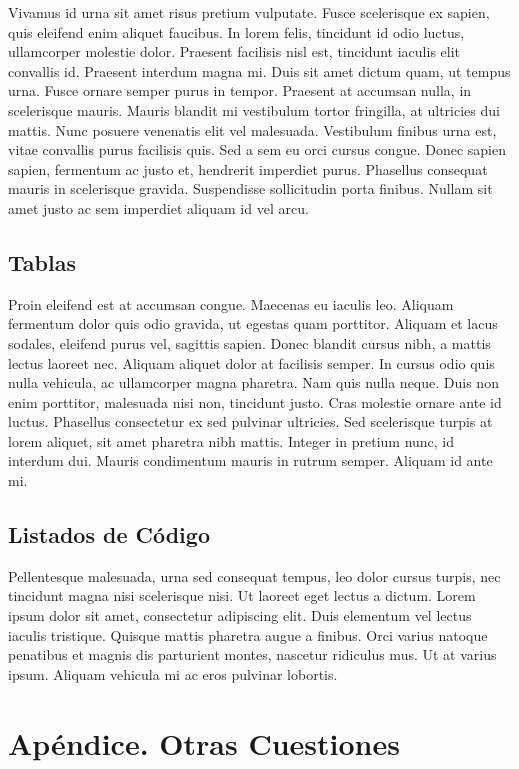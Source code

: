 \documentclass{article}
\begin{document}
Vivamus id urna sit amet risus pretium vulputate. Fusce scelerisque ex sapien, quis eleifend enim aliquet faucibus. In lorem felis, tincidunt id odio luctus, ullamcorper molestie dolor. Praesent facilisis nisl est, tincidunt iaculis elit convallis id. Praesent interdum magna mi. Duis sit amet dictum quam, ut tempus urna. Fusce ornare semper purus in tempor. Praesent at accumsan nulla, in scelerisque mauris. Mauris blandit mi vestibulum tortor fringilla, at ultricies dui mattis. Nunc posuere venenatis elit vel malesuada. Vestibulum finibus urna est, vitae convallis purus facilisis quis. Sed a sem eu orci cursus congue. Donec sapien sapien, fermentum ac justo et, hendrerit imperdiet purus. Phasellus consequat mauris in scelerisque gravida. Suspendisse sollicitudin porta finibus. Nullam sit amet justo ac sem imperdiet aliquam id vel arcu.

\subsection{Tablas}

Proin eleifend est at accumsan congue. Maecenas eu iaculis leo. Aliquam fermentum dolor quis odio gravida, ut egestas quam porttitor. Aliquam et lacus sodales, eleifend purus vel, sagittis sapien. Donec blandit cursus nibh, a mattis lectus laoreet nec. Aliquam aliquet dolor at facilisis semper. In cursus odio quis nulla vehicula, ac ullamcorper magna pharetra. Nam quis nulla neque. Duis non enim porttitor, malesuada nisi non, tincidunt justo. Cras molestie ornare ante id luctus. Phasellus consectetur ex sed pulvinar ultricies. Sed scelerisque turpis at lorem aliquet, sit amet pharetra nibh mattis. Integer in pretium nunc, id interdum dui. Mauris condimentum mauris in rutrum semper. Aliquam id ante mi.

\subsection{Listados de Código}

Pellentesque malesuada, urna sed consequat tempus, leo dolor cursus turpis, nec tincidunt magna nisi scelerisque nisi. Ut laoreet eget lectus a dictum. Lorem ipsum dolor sit amet, consectetur adipiscing elit. Duis elementum vel lectus iaculis tristique. Quisque mattis pharetra augue a finibus. Orci varius natoque penatibus et magnis dis parturient montes, nascetur ridiculus mus. Ut at varius ipsum. Aliquam vehicula mi ac eros pulvinar lobortis.

\section*{Apéndice. Otras Cuestiones}
\end{document}
